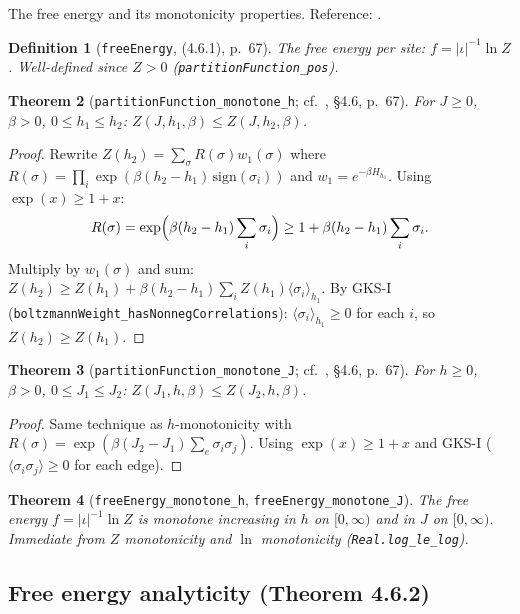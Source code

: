 \documentclass[a4paper,11pt]{article}
\newtheorem{theorem}{Theorem}
\newtheorem{definition}[theorem]{Definition}
\begin{document}
The free energy and its monotonicity properties.
Reference: \cite[{\S4.6, pp.~67--70}]{glimm-jaffe}.

\begin{definition}[\texttt{freeEnergy}, (4.6.1), p.~67]
The free energy per site: $f = |\iota|^{-1} \ln Z$.
Well-defined since $Z > 0$ (\texttt{partitionFunction\_pos}).
\end{definition}

\begin{theorem}[\texttt{partitionFunction\_monotone\_h};
  cf.\ \cite{glimm-jaffe}, {\S4.6, p.~67}]
For $J \ge 0$, $\beta > 0$, $0 \le h_1 \le h_2$:
$Z(J, h_1, \beta) \le Z(J, h_2, \beta)$.
\end{theorem}

\begin{proof}
Rewrite $Z(h_2) = \sum_\sigma R(\sigma) w_1(\sigma)$ where
$R(\sigma) = \prod_i \exp(\beta(h_2-h_1)\,\text{sign}(\sigma_i))$ and
$w_1 = e^{-\beta H_{h_1}}$.
Using $\exp(x) \ge 1 + x$:
\[
  R(\sigma) = \exp\Bigl(\beta(h_2 - h_1)\sum_i \sigma_i\Bigr)
  \ge 1 + \beta(h_2 - h_1)\sum_i \sigma_i.
\]
Multiply by $w_1(\sigma)$ and sum:
$Z(h_2) \ge Z(h_1) + \beta(h_2-h_1)\sum_i Z(h_1)\langle\sigma_i\rangle_{h_1}$.
By GKS-I (\texttt{boltzmannWeight\_hasNonnegCorrelations}):
$\langle\sigma_i\rangle_{h_1} \ge 0$ for each $i$, so
$Z(h_2) \ge Z(h_1)$.
\end{proof}

\begin{theorem}[\texttt{partitionFunction\_monotone\_J};
  cf.\ \cite{glimm-jaffe}, {\S4.6, p.~67}]
For $h \ge 0$, $\beta > 0$, $0 \le J_1 \le J_2$:
$Z(J_1, h, \beta) \le Z(J_2, h, \beta)$.
\end{theorem}

\begin{proof}
Same technique as $h$-monotonicity with
$R(\sigma) = \exp(\beta(J_2-J_1)\sum_e \sigma_i\sigma_j)$.
Using $\exp(x) \ge 1+x$ and GKS-I
($\langle\sigma_i\sigma_j\rangle \ge 0$ for each edge).
\end{proof}

\begin{theorem}[\texttt{freeEnergy\_monotone\_h}, \texttt{freeEnergy\_monotone\_J}]
The free energy $f = |\iota|^{-1}\ln Z$ is monotone increasing
in $h$ on $[0,\infty)$ and in $J$ on $[0,\infty)$.
Immediate from $Z$ monotonicity and $\ln$ monotonicity
(\texttt{Real.log\_le\_log}).
\end{theorem}

\subsection{Free energy analyticity (Theorem 4.6.2)}
\end{document}
